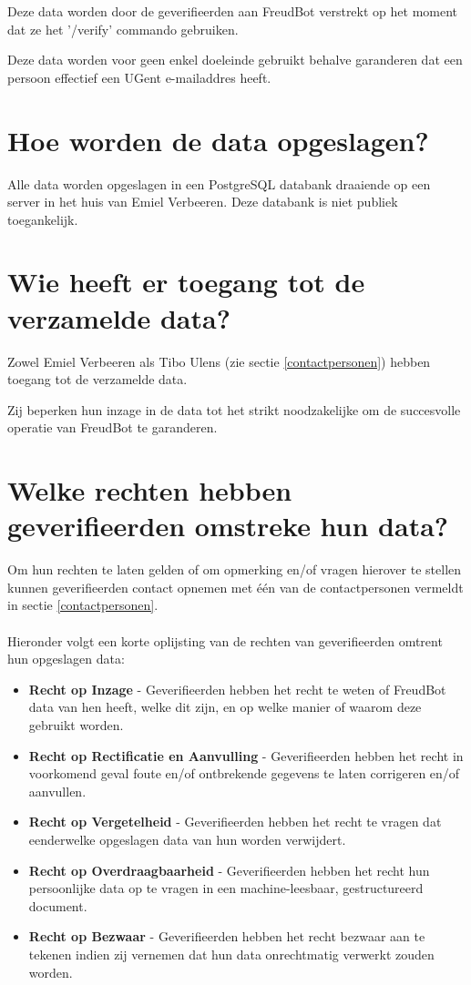 \documentclass[12pt, a4paper]{article}
\begin{document}
	Deze data worden door de geverifieerden aan FreudBot verstrekt op het
	moment dat ze het '/verify' commando gebruiken.

	Deze data worden voor geen enkel doeleinde gebruikt behalve garanderen dat
	een persoon effectief een UGent e-mailaddres heeft.

	\section{Hoe worden de data opgeslagen?}
	Alle data worden opgeslagen in een PostgreSQL databank draaiende op een
	server in het huis van Emiel Verbeeren. Deze databank is niet publiek
	toegankelijk.

	\section{Wie heeft er toegang tot de verzamelde data?}
	Zowel Emiel Verbeeren als Tibo Ulens (zie sectie \ref{contactpersonen})
	hebben toegang tot de verzamelde data.

	Zij beperken hun inzage in de data tot het strikt noodzakelijke om de
	succesvolle operatie van FreudBot te garanderen.

	\section{Welke rechten hebben geverifieerden omstreke hun data?}
	Om hun rechten te laten gelden of om opmerking en/of vragen hierover te
	stellen kunnen geverifieerden contact opnemen met één van de
	contactpersonen vermeldt in sectie \ref{contactpersonen}.
	\\
	\\
	Hieronder volgt een korte oplijsting van de rechten van geverifieerden
	omtrent hun opgeslagen data:

	\begin{itemize}
		\setlength{\itemsep}{0cm}
		\setlength{\parskip}{0cm}

		\item \textbf{Recht op Inzage} - Geverifieerden hebben het recht te
		weten of FreudBot data van hen heeft, welke dit zijn, en op welke
		manier of waarom deze gebruikt worden.
		\item \textbf{Recht op Rectificatie en Aanvulling} - Geverifieerden
		hebben het recht in voorkomend geval foute en/of ontbrekende gegevens
		te laten corrigeren en/of aanvullen.
		\item \textbf{Recht op Vergetelheid} - Geverifieerden hebben het recht
		te vragen dat eenderwelke opgeslagen data van hun worden verwijdert.
		\item \textbf{Recht op Overdraagbaarheid} - Geverifieerden hebben het
		recht hun persoonlijke data op te vragen in een machine-leesbaar,
		gestructureerd document.
		\item \textbf{Recht op Bezwaar} - Geverifieerden hebben het recht
		bezwaar aan te tekenen indien zij vernemen dat hun data onrechtmatig
		verwerkt zouden worden.
	\end{itemize}
\end{document}
